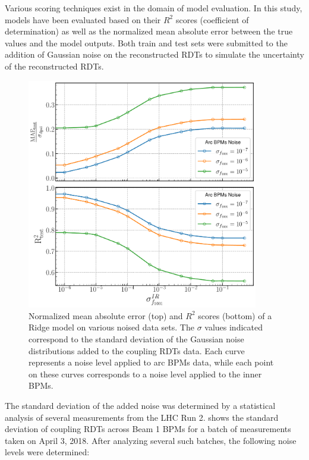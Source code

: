 Various scoring techniques exist in the domain of model evaluation.
In this study, models have been evaluated based on their \(R^2\) scores (coefficient of determination) as well as the normalized mean absolute error between the true values and the model outputs.
Both train and test sets were submitted to the addition of Gaussian noise on the reconstructed RDTs to simulate the uncertainty of the reconstructed RDTs.

\begin{figure}[!htb]
    \centering
    \includegraphics*[width=0.9\textwidth]{Figures/ML_for_IR_Coupling/ridge_performance.pdf}
    \caption{Normalized mean absolute error (top) and \(R^2\) scores (bottom) of a Ridge model on various noised data sets. The \(\sigma\) values indicated correspond to the standard deviation of the Gaussian noise distributions added to the coupling RDTs data. Each curve represents a noise level applied to arc BPMs data, while each point on these curves corresponds to a noise level applied to the inner BPMs.}
    \label{fig:ridge_performance}
\end{figure}

The standard deviation of the added noise was determined by a statistical analysis of several measurements from the LHC Run 2.
 shows the standard deviation of coupling RDTs across Beam 1 BPMs for a batch of measurements taken on April 3, 2018.
After analyzing several such batches, the following noise levels were determined:

